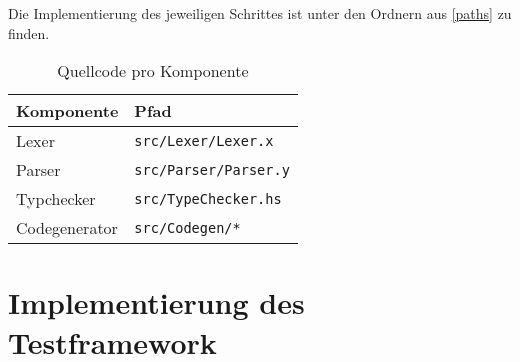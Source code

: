 Die Implementierung des jeweiligen Schrittes ist unter den Ordnern aus \autoref{paths} zu finden.

\begin{table}[H]
	\centering
	\begin{tabular}{l|l}
		\textbf{Komponente} & \textbf{Pfad}\\
		\hline
		Lexer & \verb+src/Lexer/Lexer.x+\\
		Parser & \verb+src/Parser/Parser.y+\\
		Typchecker & \verb+src/TypeChecker.hs+\\
		Codegenerator & \verb+src/Codegen/*+\\
	\end{tabular}
	\caption{Quellcode pro Komponente}\label{paths}
\end{table}

\section{Implementierung des Testframework}

